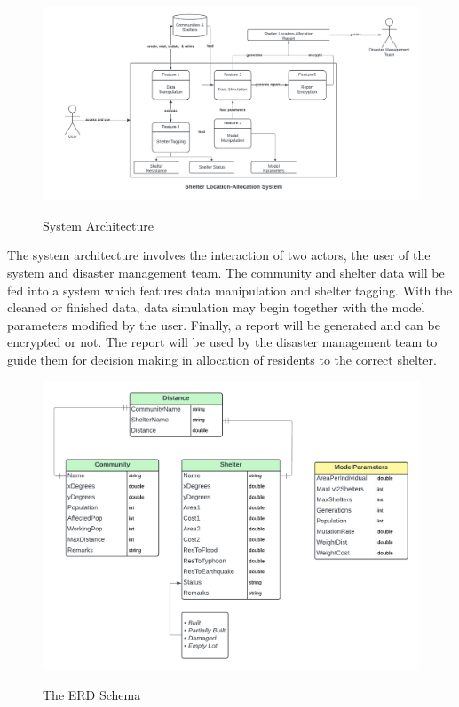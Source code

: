 	\begin{figure}[h!]
		\caption{System Architecture}
		\centering
		\includegraphics[width=\textwidth]{Context Diagram}
		\label{SystemArch}
	\end{figure}
	
	The system architecture involves the interaction of two actors, the user of the system and disaster management team. The community and shelter data will be fed into a system which features data manipulation and shelter tagging. With the cleaned or finished data, data simulation may begin together with the model parameters modified by the user. Finally, a report will be generated and can be encrypted or not. The report will be used by the disaster management team to guide them for decision making in allocation of residents to the correct shelter.

	\begin{figure}[h!]
		\caption{The ERD Schema}
		\centering
		\includegraphics[width=\textwidth]{ERD}
		\label{ERD}
	\end{figure}
	
